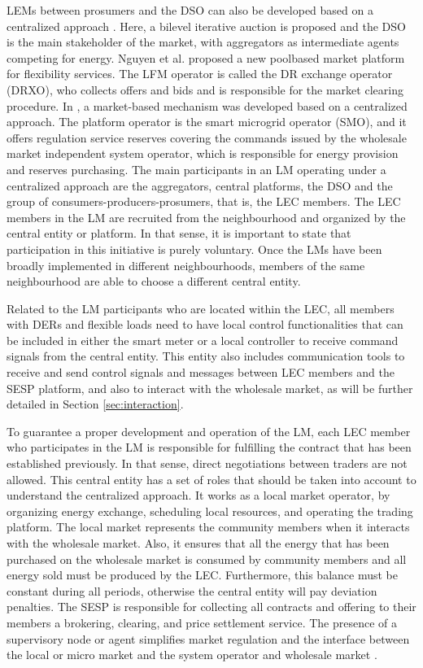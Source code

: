 LEMs between prosumers and the DSO can also be developed based on a centralized approach \cite{faqiry2017distributed}. Here, a bilevel iterative auction is proposed and the DSO is the main stakeholder of the market, with aggregators as intermediate agents competing for energy. Nguyen et al. \cite{nguyen2010pool} proposed a new poolbased market platform for flexibility services. The LFM operator is called the DR exchange operator (DRXO), who collects offers and bids and is responsible for the market clearing procedure. In \cite{paschalidis2012demand}, a market-based mechanism was developed based on a centralized approach. The platform operator is the smart microgrid operator (SMO), and it offers regulation service reserves covering the commands issued by the wholesale market independent system operator, which is responsible for energy provision and reserves purchasing. The main participants in an LM operating under a centralized approach are the aggregators, central platforms, the DSO and the group of consumers-producers-prosumers, that is, the LEC members. The LEC members in the LM are recruited from the neighbourhood and organized by the central entity or platform. In that sense, it is important to state that participation in this initiative is purely voluntary. Once the LMs have been broadly implemented in different neighbourhoods, members of the same neighbourhood are able to
choose a different central entity.

Related to the LM participants who are located within the LEC, all members with DERs and flexible loads need to have local control functionalities that can be included in either the smart meter or a local controller to receive command signals from the central entity. This entity also includes communication tools to receive and send control signals and messages between LEC members and the SESP platform, and also to interact with the wholesale market, as will be further detailed in Section \ref{sec:interaction}.

To guarantee a proper development and operation of the LM, each LEC member who participates in the LM is responsible for fulfilling the contract that has been established previously. In that sense, direct negotiations between traders are not allowed. This central entity has a set of roles that should be taken into account to understand the centralized approach. It works as a local market operator, by organizing energy exchange, scheduling local resources, and operating the trading platform. The local market represents the community members when it interacts with the wholesale market. Also, it ensures that all the energy that has been purchased on the wholesale market is consumed by community members and all energy sold must be produced by the LEC. Furthermore, this balance must be constant during all periods, otherwise the central entity will pay deviation penalties. The SESP is responsible for collecting all contracts and offering to their members a brokering, clearing, and price settlement service. The presence of a supervisory node or agent simplifies market regulation and the interface between the local or micro market and the system operator and wholesale market \cite{moret2018energy}.

